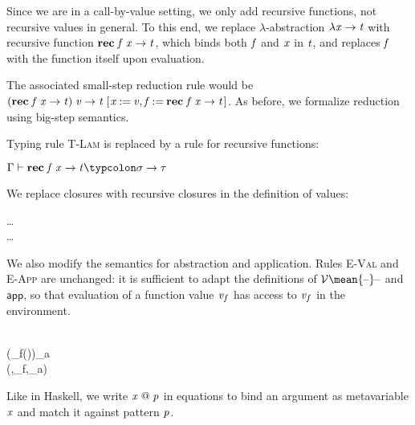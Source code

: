 Since we are in a call-by-value setting, we only add recursive
functions, not recursive values in general.
To this end, we replace $\lambda$-abstraction \ensuremath{\lambda \Varid{x}\to \Varid{t}} with recursive
function \ensuremath{\mathbf{rec}\;\Varid{f}\;\Varid{x}\to \Varid{t}}, which binds both \ensuremath{\Varid{f}} and \ensuremath{\Varid{x}} in \ensuremath{\Varid{t}}, and
replaces \ensuremath{\Varid{f}} with the function itself upon evaluation.

The associated small-step reduction rule would be
\ensuremath{(\mathbf{rec}\;\Varid{f}\;\Varid{x}\to \Varid{t})\;\Varid{v}\to \Varid{t}\;[\mskip1.5mu \Varid{x}\mathbin{:=}\Varid{v},\Varid{f}\mathbin{:=}\mathbf{rec}\;\Varid{f}\;\Varid{x}\to \Varid{t}\mskip1.5mu]}. As before,
we formalize reduction using big-step semantics.

Typing rule \textsc{T-Lam} is replaced by a rule for recursive functions:
\begin{typing}
  {\ensuremath{\Gamma\vdash\mathbf{rec}\;\Varid{f}\;\Varid{x}\to \Varid{t}\typcolon\sigma\to \tau}}
\end{typing}
We replace closures with recursive closures in the definition of values:
\begin{hscode}\SaveRestoreHook
{}%
%
%
\>[3]{}\mathbin{::=}\;\;\to {}\mid \ldots{}\<[E]%
\\
\>[3]{}\mathbin{::=}\rho{}\mid \ldots{}\<[E]%
\ColumnHook
\end{hscode}\resethooks
We also modify the semantics for abstraction and application. Rules
\textsc{E-Val} and \textsc{E-App} are unchanged: it is sufficient to adapt the
definitions of \ensuremath{\mathcal{V}\mean{\text{\textendash}}\text{\textendash}} and \ensuremath{\mathsf{app}}, so that evaluation of a function value
\ensuremath{\Varid{v}_f} has access to \ensuremath{\Varid{v}_f} in the environment.
\begin{hscode}\SaveRestoreHook
{}%
%
%
%
\>[B]{}\rho{}\<[32]%
\>[32]{}\mathrel{=}\rho{}\<[E]%
\\[\blanklineskip]%
\>[B]{}\;(_f(\rho\myquote{}))\;_a\mathrel{=}{}\<[E]%
\\
\>[B]{}\<[3]%
\>[3]{}(\rho\myquote,\mathbin{:=}_f,\mathbin{:=}_a)\vdash{}\<[E]%
\ColumnHook
\end{hscode}\resethooks
Like in Haskell, we write \ensuremath{\Varid{x}\mathrel{@}\Varid{p}} in equations to bind an argument as
metavariable \ensuremath{\Varid{x}} and match it against pattern \ensuremath{\Varid{p}}.

